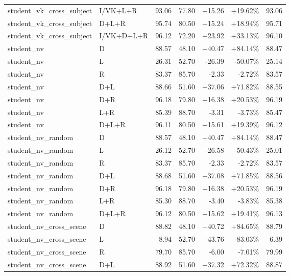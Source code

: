 \documentclass[UTF8,10pt,a4paper]{ctexart}
\newcommand{\better}[1]{\textcolor{ImpBlue}{#1}}
\newcommand{\worse}[1]{\textcolor{DropRed}{#1}}
\begin{document}
{\begin{longtable}{llrrrrr}
student\_vk\_cross\_subject & I/VK+L+R & 93.06 & 77.80 & \better{+15.26} & \better{+19.62\%} & 93.06\\
student\_vk\_cross\_subject & D+L+R & 95.74 & 80.50 & \better{+15.24} & \better{+18.94\%} & 95.71\\
student\_vk\_cross\_subject & I/VK+D+L+R & 96.12 & 72.20 & \better{+23.92} & \better{+33.13\%} & 96.10\\
student\_nv & D & 88.57 & 48.10 & \better{+40.47} & \better{+84.14\%} & 88.47\\
student\_nv & L & 26.31 & 52.70 & \worse{-26.39} & \worse{-50.07\%} & 25.14\\
student\_nv & R & 83.37 & 85.70 & \worse{-2.33} & \worse{-2.72\%} & 83.57\\
student\_nv & D+L & 88.66 & 51.60 & \better{+37.06} & \better{+71.82\%} & 88.55\\
student\_nv & D+R & 96.18 & 79.80 & \better{+16.38} & \better{+20.53\%} & 96.19\\
student\_nv & L+R & 85.39 & 88.70 & \worse{-3.31} & \worse{-3.73\%} & 85.47\\
student\_nv & D+L+R & 96.11 & 80.50 & \better{+15.61} & \better{+19.39\%} & 96.12\\
student\_nv\_random & D & 88.57 & 48.10 & \better{+40.47} & \better{+84.14\%} & 88.47\\
student\_nv\_random & L & 26.12 & 52.70 & \worse{-26.58} & \worse{-50.43\%} & 25.01\\
student\_nv\_random & R & 83.37 & 85.70 & \worse{-2.33} & \worse{-2.72\%} & 83.57\\
student\_nv\_random & D+L & 88.68 & 51.60 & \better{+37.08} & \better{+71.85\%} & 88.56\\
student\_nv\_random & D+R & 96.18 & 79.80 & \better{+16.38} & \better{+20.53\%} & 96.19\\
student\_nv\_random & L+R & 85.30 & 88.70 & \worse{-3.40} & \worse{-3.83\%} & 85.38\\
student\_nv\_random & D+L+R & 96.12 & 80.50 & \better{+15.62} & \better{+19.41\%} & 96.13\\
student\_nv\_cross\_scene & D & 88.82 & 48.10 & \better{+40.72} & \better{+84.65\%} & 88.79\\
student\_nv\_cross\_scene & L & 8.94 & 52.70 & \worse{-43.76} & \worse{-83.03\%} & 6.39\\
student\_nv\_cross\_scene & R & 79.70 & 85.70 & \worse{-6.00} & \worse{-7.01\%} & 79.99\\
student\_nv\_cross\_scene & D+L & 88.92 & 51.60 & \better{+37.32} & \better{+72.32\%} & 88.87\\

\end{longtable}}
\end{document}
